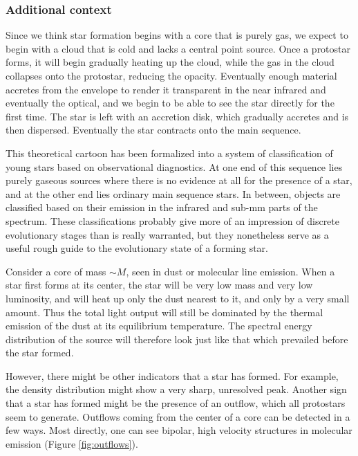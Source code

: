\documentclass[a4paper,10pt]{article}
\begin{document}
\subsubsection{Additional context}

Since we think star formation begins with a core that is purely gas, we expect to begin with a cloud that is cold and lacks a central point source. Once a protostar forms, it will begin gradually heating up the cloud, while the gas in the cloud collapses onto the protostar, reducing the opacity. Eventually enough material accretes from the envelope to render it transparent in the near infrared and eventually the optical, and we begin to be able to see the star directly for the first time. The star is left with an accretion disk, which gradually accretes and is then dispersed. Eventually the star contracts onto the main sequence.

{\noindent}This theoretical cartoon has been formalized into a system of classification of young stars based on observational diagnostics. At one end of this sequence lies purely gaseous sources where there is no evidence at all for the presence of a star, and at the other end lies ordinary main sequence stars. In between, objects are classified based on their emission in the infrared and sub-mm parts of the spectrum. These classifications probably give more of an impression of discrete evolutionary stages than is really warranted, but they nonetheless serve as a useful rough guide to the evolutionary state of a forming star.

{\noindent}Consider a core of mass $\sim M$, seen in dust or molecular line emission. When a star first forms at its center, the star will be very low mass and very low luminosity, and will heat up only the dust nearest to it, and only by a very small amount. Thus the total light output will still be dominated by the thermal emission of the dust at its equilibrium temperature. The spectral energy distribution of the source will therefore look just like that which prevailed before the star formed.

{\noindent}However, there might be other indicators that a star has formed. For example, the density distribution might show a very sharp, unresolved peak. Another sign that a star has formed might be the presence of an outflow, which all protostars seem to generate. Outflows coming from the center of a core can be detected in a few ways. Most directly, one can see bipolar, high velocity structures in molecular emission (Figure \ref{fig:outflows}).
\end{document}
